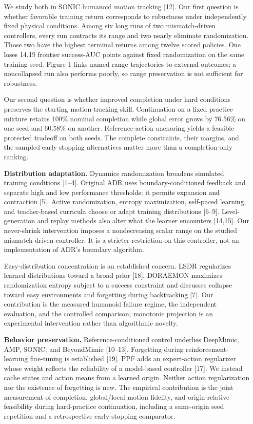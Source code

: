 \documentclass[letterpaper,10pt,conference]{ieeeconf}
\begin{document}
We study both in SONIC humanoid motion tracking [12]. Our first question is whether favorable training return corresponds to robustness under independently fixed physical conditions. Among six long runs of two mismatch-driven controllers, every run contracts its range and two nearly eliminate randomization. Those two have the highest terminal returns among twelve scored policies. One loses 14.19 frontier success-AUC points against fixed randomization on the same training seed. Figure 1 links named range trajectories to external outcomes; a noncollapsed run also performs poorly, so range preservation is not sufficient for robustness.

Our second question is whether improved completion under hard conditions preserves the starting motion-tracking skill. Continuation on a fixed practice mixture retains 100\% nominal completion while global error grows by 76.56\% on one seed and 60.58\% on another. Reference-action anchoring yields a feasible protected tradeoff on both seeds. The complete constraints, their margins, and the sampled early-stopping alternatives matter more than a completion-only ranking.

\textbf{Distribution adaptation.} Dynamics randomization broadens simulated training conditions [1--4]. Original ADR uses boundary-conditioned feedback and separate high and low performance thresholds; it permits expansion and contraction [5]. Active randomization, entropy maximization, self-paced learning, and teacher-based curricula choose or adapt training distributions [6--9]. Level-generation and replay methods also alter what the learner encounters [14,15]. Our never-shrink intervention imposes a nondecreasing scalar range on the studied mismatch-driven controller. It is a stricter restriction on this controller, not an implementation of ADR's boundary algorithm.

Easy-distribution concentration is an established concern. LSDR regularizes learned distributions toward a broad prior [18]. DORAEMON maximizes randomization entropy subject to a success constraint and discusses collapse toward easy environments and forgetting during backtracking [7]. Our contribution is the measured humanoid failure regime, the independent evaluation, and the controlled comparison; monotonic projection is an experimental intervention rather than algorithmic novelty.

\textbf{Behavior preservation.} Reference-conditioned control underlies DeepMimic, AMP, SONIC, and BeyondMimic [10--13]. Forgetting during reinforcement-learning fine-tuning is established [19]. PPF adds an expert-action regularizer whose weight reflects the reliability of a model-based controller [17]. We instead cache states and action means from a learned origin. Neither action regularization nor the existence of forgetting is new. The empirical contribution is the joint measurement of completion, global/local motion fidelity, and origin-relative feasibility during hard-practice continuation, including a same-origin seed repetition and a retrospective early-stopping comparator.
\end{document}
